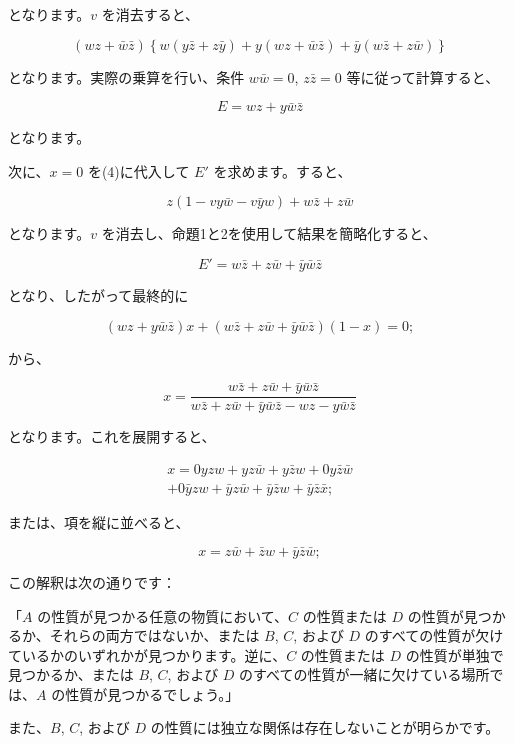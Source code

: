 \documentclass[a4paper,11pt,openany]{ltjsbook}
\begin{document}
となります。$v$ を消去すると、

\[
(wz + \bar{w}\bar{z}) \left\{ w(y\bar{z} + z\bar{y}) + y(wz + \bar{w}\bar{z}) + \bar{y}(w\bar{z} + z\bar{w}) \right\}
\]

となります。実際の乗算を行い、条件 $w\bar{w} = 0$, $z\bar{z} = 0$ 等に従って計算すると、

\[
E = wz + y\bar{w}\bar{z}
\]

となります。

次に、$x = 0$ を(4)に代入して $E'$ を求めます。すると、

\[
z(1 - vy\bar{w} - v\bar{y}w) + w\bar{z} + z\bar{w}
\]

となります。$v$ を消去し、命題1と2を使用して結果を簡略化すると、

\[
E' = w\bar{z} + z\bar{w} + \bar{y}\bar{w}\bar{z}
\]

となり、したがって最終的に

\begin{equation}
(wz + y\bar{w}\bar{z})x + (w\bar{z} + z\bar{w} + \bar{y}\bar{w}\bar{z})(1-x) = 0;
\end{equation}

から、

\[
x =
\frac{w\bar{z} + z\bar{w} + \bar{y}\bar{w}\bar{z}}
{w\bar{z} + z\bar{w} + \bar{y}\bar{w}\bar{z} - wz - y\bar{w}\bar{z}}
\]

となります。これを展開すると、

\begin{eqnarray*}
x = 0yzw + yz\bar{w} + y\bar{z}w + 0y\bar{z}\bar{w}\\
  + 0\bar{y}zw + \bar{y}z\bar{w} + \bar{y}\bar{z}w + \bar{y}\bar{z}\bar{x};
\end{eqnarray*}

または、項を縦に並べると、

\begin{equation}
x = z\bar{w} + \bar{z}w + \bar{y}\bar{z}\bar{w};
\end{equation}

この解釈は次の通りです：

「$A$ の性質が見つかる任意の物質において、$C$ の性質または $D$ の性質が見つかるか、それらの両方ではないか、または $B$, $C$, および $D$ のすべての性質が欠けているかのいずれかが見つかります。逆に、$C$ の性質または $D$ の性質が単独で見つかるか、または $B$, $C$, および $D$ のすべての性質が一緒に欠けている場所では、$A$ の性質が見つかるでしょう。」

また、$B$, $C$, および $D$ の性質には独立な関係は存在しないことが明らかです。
\end{document}
